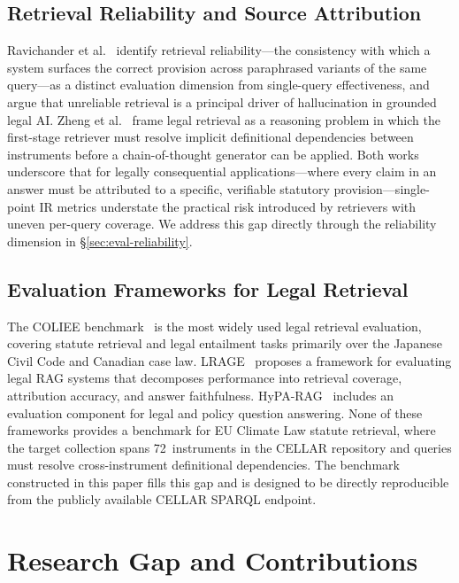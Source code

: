 \documentclass[sigconf,screen]{acmart}
\begin{document}
\subsection{Retrieval Reliability and Source Attribution}
\label{sec:related-reliability}

Ravichander et al.~\cite{reliableretrievallegal2024} identify
retrieval reliability---the consistency with which a system surfaces
the correct provision across paraphrased variants of the same
query---as a distinct evaluation dimension from single-query
effectiveness, and argue that unreliable retrieval is a principal
driver of hallucination in grounded legal AI.  Zheng et
al.~\cite{reasoninglegal2024} frame legal retrieval as a reasoning
problem in which the first-stage retriever must resolve implicit
definitional dependencies between instruments before a
chain-of-thought generator can be applied.  Both works underscore
that for legally consequential applications---where every claim in an
answer must be attributed to a specific, verifiable statutory
provision---single-point IR metrics understate the practical risk
introduced by retrievers with uneven per-query coverage.  We address
this gap directly through the reliability dimension in
\S\ref{sec:eval-reliability}.

\subsection{Evaluation Frameworks for Legal Retrieval}
\label{sec:related-eval}

The COLIEE benchmark~\cite{nowjcoliee2023} is the most widely used
legal retrieval evaluation, covering statute retrieval and legal
entailment tasks primarily over the Japanese Civil Code and Canadian
case law.  LRAGE~\cite{lrage2024} proposes a framework for evaluating
legal RAG systems that decomposes performance into retrieval coverage,
attribution accuracy, and answer faithfulness.  HyPA-RAG~\cite{hyparag2024}
includes an evaluation component for legal and policy question
answering.  None of these frameworks provides a benchmark for EU
Climate Law statute retrieval, where the target collection spans
72~instruments in the CELLAR repository and queries must resolve
cross-instrument definitional dependencies.  The benchmark
constructed in this paper fills this gap and is designed to be
directly reproducible from the publicly available CELLAR SPARQL
endpoint.

\section{Research Gap and Contributions}
\label{sec:gap}
\end{document}
